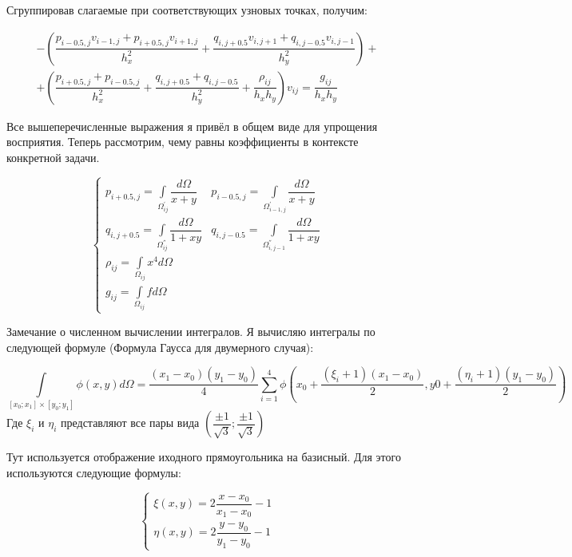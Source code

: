 \documentclass[12pt]{article}
\begin{document}
Сгруппировав слагаемые при соответствующих узновых точках, получим:

\begin{eqnarray}
 - \left( \dfrac{p_{i-0.5, j}v_{i-1,j} + p_{i+0.5, j}v_{i+1,j}}{h_x^2} + \dfrac{q_{i, j+0.5}v_{i,j+1} + q_{i, j-0.5}v_{i,j-1}}{h_y^2} \right) + \nonumber 
\\
+ \left( \dfrac{p_{i+0.5, j} + p_{i-0.5, j}}{h_x^2} + \dfrac{q_{i, j+0.5} + q_{i, j-0.5}}{h_y^2} + \dfrac{\rho_{ij}}{h_xh_y} \right) v_{ij}
 = \dfrac{g_{ij}}{h_xh_y}
\end{eqnarray}

Все вышеперечисленные выражения я привёл в общем виде для упрощения восприятия. Теперь рассмотрим, чему равны коэффициенты в контексте конкретной задачи.

\begin{equation}
\begin{cases}
p_{i+0.5,j} = \int\limits_{\Omega_{ij}^{'}}{\dfrac{d\Omega}{x + y}} &
p_{i-0.5,j} = \int\limits_{\Omega_{i-1,j}^{'}}{\dfrac{d\Omega}{x + y}} \\
q_{i,j+0.5} = \int\limits_{\Omega_{ij}^{''}}{\dfrac{d\Omega}{1 + xy}} &
q_{i,j-0.5} = \int\limits_{\Omega_{i,j-1}^{''}}{\dfrac{d\Omega}{1 + xy}} \\
\rho_{ij} = \int\limits_{\Omega_{ij}}{x^4 d \Omega} \\
g_{ij} = \int\limits_{\Omega_{ij}}{fd \Omega} 
\end{cases}
\end{equation}

Замечание о численном вычислении интегралов. Я вычисляю интегралы по следующей формуле (Формула Гаусса для двумерного случая):

\begin{equation}
\int\limits_{[x_0; x_1] \times [y_0; y_1]}{\phi(x, y)d\Omega} = \dfrac{(x_1-x_0)(y_1-y_0)}{4} \sum\limits_{i=1}^4\phi\left(x_0 + \dfrac{(\xi_i+1)(x_1-x_0)}{2} ,y0 + \dfrac{(\eta_i+1)(y_1-y_0)}{2} \right)
\end{equation}
Где $\xi_i$ и $\eta_i$ представляют все пары вида $\left(\dfrac{\pm 1}{\sqrt{3}}; \dfrac{\pm 1}{\sqrt{3}}\right)$

Тут используется отображение иходного прямоугольника на базисный. Для этого используются следующие формулы:

\begin{equation}
\begin{cases}
\xi(x, y) = 2 \dfrac{x - x_0}{x_1-x_0} - 1 \\
\eta(x, y) = 2 \dfrac{y - y_0}{y_1-y_0} - 1
\end{cases}
\end{equation}
\end{document}
